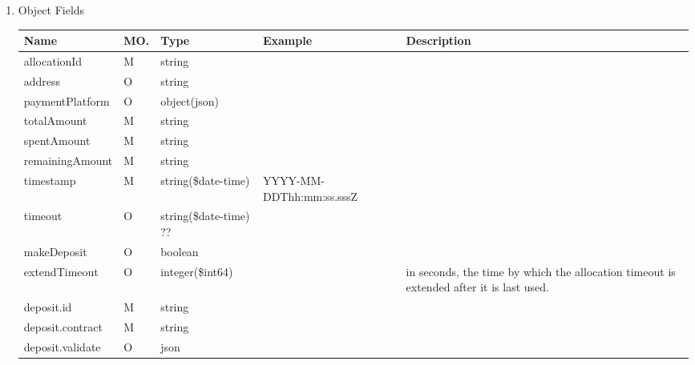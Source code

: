\begin{enumerate}
\begin{enumerate}
\item Object Fields

\begin{table}[H]
\footnotesize

\begin{center}
\begin{tabular}{|p{3cm}|l|p{3cm}|p{3cm}|p{4cm}|} 
\hline
\rowcolor{lightgray}	Name	& MO.	& Type	& Example & 	Description \\
\hline

allocationId			& M & string 				&							&  \\
\hline

address					& O & string 				&							&  \\
\hline

paymentPlatform			& O & object(json)			&							&	\\
\hline

totalAmount				& M & string 				&							&  \\
\hline

spentAmount				& M & string 				&							&  \\
\hline

remainingAmount			& M & string 				&							&  \\
\hline

timestamp 				& M & string(\$date-time) 	&  YYYY-MM-DDThh:mm:ss.sssZ	&  \\
\hline

timeout					& O & string(\$date-time) ?? &							&  \\
\hline

makeDeposit				& O & boolean				&							&  \\
\hline

extendTimeout			& O & integer(\$int64)		&							& 	in seconds, the time by which the allocation timeout is extended 
																					after it is last used. \\
\hline

deposit.id				& M & string 				&							&  \\
\hline

deposit.contract		& M & string 				&							&  \\
\hline

deposit.validate		& O & json					& 							& 	\\
\hline
			
\end{tabular}
\end{center}
\end{table}


\end{enumerate}
\end{enumerate}

